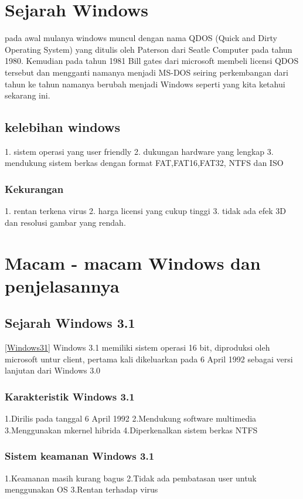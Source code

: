 
\section{Sejarah Windows}
	pada awal mulanya windows muncul dengan nama QDOS (Quick and Dirty Operating System) yang ditulis oleh Paterson dari Seatle Computer pada tahun 1980.
Kemudian pada tahun 1981 Bill gates dari microsoft membeli licensi QDOS tersebut dan mengganti namanya menjadi MS-DOS seiring perkembangan dari tahun ke tahun namanya berubah menjadi Windows seperti yang kita ketahui sekarang ini.
\subsection{kelebihan windows}
	1.	sistem operasi yang user friendly
	2.	dukungan hardware yang lengkap
	3.	mendukung sistem berkas dengan format FAT,FAT16,FAT32, NTFS dan ISO
\subsubsection{Kekurangan}
	1.	rentan terkena virus
	2.	harga licensi yang cukup tinggi
	3.	tidak ada efek 3D dan resolusi gambar yang rendah.


\section{Macam - macam Windows dan penjelasannya}

\subsection{Sejarah Windows 3.1}
\ref{Windows31}
	Windows 3.1 memiliki sistem operasi 16 bit, diproduksi oleh microsoft untur client, pertama kali dikeluarkan pada 6 April 1992 sebagai versi lanjutan dari Windows 3.0 \cite{brodsky1996just}
	\subsubsection{Karakteristik Windows 3.1}
		1.Dirilis pada tanggal 6 April 1992
		2.Mendukung software multimedia
		3.Menggunakan mkernel hibrida
		4.Diperkenalkan sistem berkas NTFS
	\subsubsection{Sistem keamanan Windows 3.1}
		1.Keamanan masih kurang bagus
		2.Tidak ada pembatasan user untuk menggunakan OS
		3.Rentan terhadap virus
